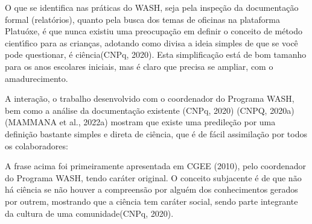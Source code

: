 \documentclass[
12pt,		%
openright,	%
twoside,  %
a4paper,			%
chapter=TITLE,		%
english,			%
french,				%
spanish,			%
brazil				%
]{USPSC-classe/USPSC}
\begin{document}
O que se identifica nas pr\'aticas do WASH, seja pela inspe\c{c}\~ao da documenta\c{c}\~ao formal (relat\'orios), quanto pela busca dos temas de oficinas na plataforma \textquotedbl Platu\'oxe\textquotedbl , \'e que nunca existiu uma preocupa\c{c}\~ao em definir o conceito de m\'etodo cient\'{\i}fico para as crian\c{c}as, adotando como \textquotedbl divisa \textquotedbl  a ideia simples de que \textquotedbl se voc\^e pode questionar, \'e ci\^encia\textquotedbl   (CNPq, 2020). Esta simplifica\c{c}\~ao est\'a de bom tamanho para os anos escolares iniciais, mas \'e claro que precisa se ampliar, com o amadurecimento.

















A intera\c{c}\~ao, o trabalho desenvolvido com o coordenador do Programa WASH, bem como a an\'alise da documenta\c{c}\~ao existente  (CNPq, 2020)  (CNPQ, 2020a)  (MAMMANA et al., 2022a) mostram que existe uma predile\c{c}\~ao por uma defini\c{c}\~ao bastante simples e direta de ci\^encia, que \'e de f\'acil assimila\c{c}\~ao por todos os colaboradores:


















\noindent\begin{center}\mbox{\centering{}}\end{center}


A frase acima foi primeiramente apresentada em  CGEE (2010), pelo coordenador do Programa WASH, tendo car\'ater original. O conceito subjacente \'e de que \textquotedbl n\~ao h\'a ci\^encia se n\~ao houver a compreens\~ao por algu\'em dos conhecimentos gerados por outrem, mostrando que a ci\^encia tem car\'ater social, sendo parte integrante da cultura de uma comunidade\textquotedbl   (CNPq, 2020).
\end{document}
